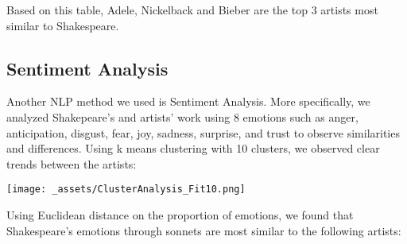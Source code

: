 \documentclass[10pt,a4paper]{article}
\begin{document}
Based on this table, Adele, Nickelback and Bieber are the top 3 artists most similar to Shakespeare.

\subsection{Sentiment Analysis}

Another NLP method we used is Sentiment Analysis. More specifically, we analyzed Shakepeare's and artists' work using 8 emotions such as anger, anticipation, disgust, fear, joy, sadness, surprise, and trust to observe similarities and differences. Using k means clustering with 10 clusters, we observed clear trends between the artists:

\begin{center}
\texttt{[image: \_assets/ClusterAnalysis\_Fit10.png]}
\end{center}

Using Euclidean distance on the proportion of emotions, we found that Shakespeare's emotions through sonnets are most similar to the following artists:

   
\begin{table}[ht]
\centering
{}
\caption{Ranked Top 10 Most Similar Music Artist to Shakespeare Based on Sentiments} 
\label{tab:wordranktable}
\end{table}
\end{document}
